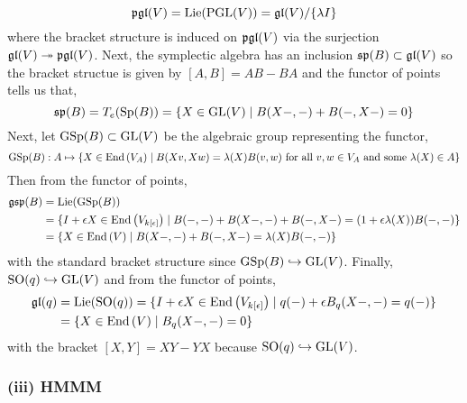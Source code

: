 \documentclass[12pt]{article}
\begin{document}
\[ \mathfrak{pgl}(V) = \mathrm{Lie}(\mathrm{PGL}(V)) = \mathfrak{gl}(V) / \{ \lambda I \} \]
where the bracket structure is induced on $\mathfrak{pgl}(V)$ via the surjection $\mathfrak{gl}(V) \twoheadrightarrow \mathfrak{pgl}(V)$. Next, the symplectic algebra has an inclusion $\mathfrak{sp}(B) \subset \mathfrak{gl}(V)$ so the bracket structue is given by $[A,B] = AB - BA$ and the functor of points tells us that,
\[ \mathfrak{sp}(B) = T_e(\mathrm{Sp}(B)) = \{ X \in \mathrm{GL}(V) \mid B(X-,-) + B(-,X-) = 0 \} \]
Next, let $\mathrm{GSp}(B) \subset \mathrm{GL}(V)$ be the algebraic group representing the functor,
\[ \mathrm{GSp}(B) : A \mapsto \{ X \in \mathrm{End}\left( V_A \right) \mid B(Xv,Xw) = \lambda(X) B(v,w) \text{ for all } v,w \in V_A \text{ and some } \lambda(X) \in A \} \]
Then from the functor of points,
\begin{align*}
\mathfrak{gsp}(B) & = \mathrm{Lie}(\mathrm{GSp}(B)) 
\\
& = \{ I + \epsilon X \in \mathrm{End}\left( V_{k[\epsilon]} \right) \mid B(-,-) + B(X-,-) + B(-,X-) = (1 + \epsilon \lambda(X)) B(-,-) \}
\\
& = \{ X \in \mathrm{End}\left( V \right) \mid B(X-,-) + B(-,X-) = \lambda(X) B(-,-) \}
\end{align*}
with the standard bracket structure since $\mathrm{GSp}(B) \hookrightarrow \mathrm{GL}(V)$. Finally, $\mathrm{SO}(q) \hookrightarrow \mathrm{GL}(V)$ and from the functor of points,
\begin{align*}
\mathfrak{gl}(q) & = \mathrm{Lie}(\mathrm{SO}(q)) = \{ I + \epsilon X \in \mathrm{End}\left( V_{k[\epsilon]} \right) \mid q(-) + \epsilon B_q(X-,-) = q(-) \} 
\\
& = \{ X \in \mathrm{End}\left( V \right) \mid B_q(X-,-) = 0 \}
\end{align*}
with the bracket $[X,Y] = XY - YX$ because $\mathrm{SO}(q) \hookrightarrow \mathrm{GL}(V)$.

\subsubsection{(iii) HMMM}
\end{document}
